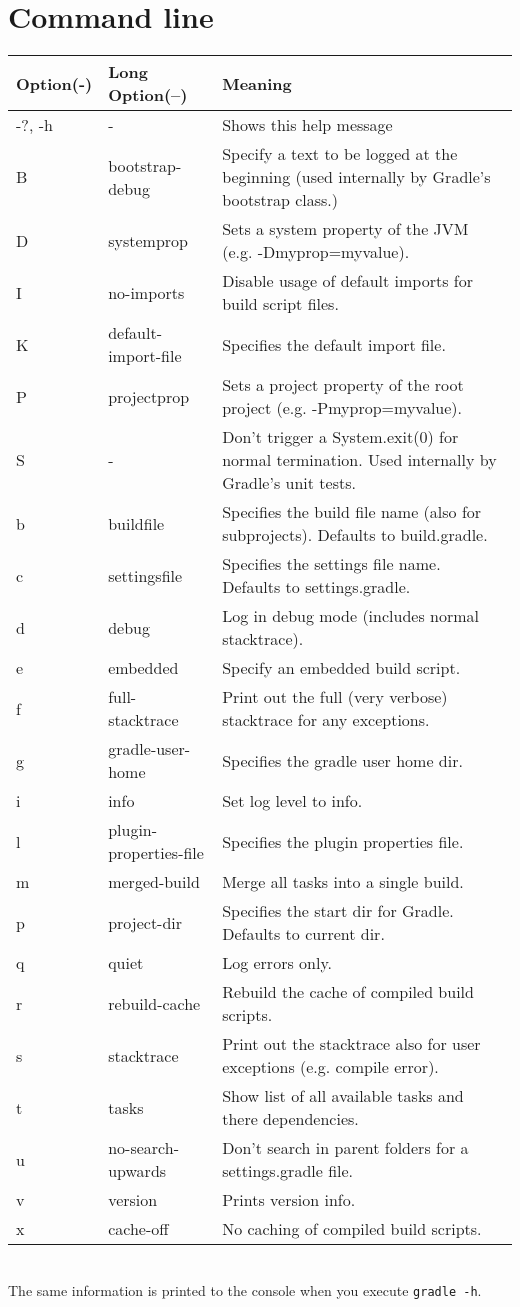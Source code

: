 \chapter{Command line} %
\label{cha:command_line}

\begin{tabular}{l|l|l}
\textbf{Option}(-) & \textbf{Long Option}(--) & \textbf{Meaning}\\ \hline
-?, -h  & -           & Shows this help message\\
B & bootstrap-debug & Specify a text to be logged at the beginning (used internally by Gradle's bootstrap class.)\\
D & systemprop       & Sets a system property of the JVM (e.g. -Dmyprop=myvalue).\\ 
I & no-imports        & Disable usage of default imports for build script files.\\
K & default-import-file & Specifies the default import file.\\ 
P & projectprop  & Sets a project property of the root project (e.g. -Pmyprop=myvalue).\\
S & - & Don't trigger a System.exit(0) for normal termination. Used internally by Gradle's unit tests.\\
b & buildfile        & Specifies the build file name (also for subprojects). Defaults to build.gradle.\\
c & settingsfile     & Specifies the settings file name. Defaults to settings.gradle.\\
d & debug            & Log in debug mode (includes normal stacktrace).\\
e & embedded         & Specify an embedded build script.\\
f & full-stacktrace  & Print out the full (very verbose) stacktrace for any exceptions.\\
g & gradle-user-home & Specifies the gradle user home dir.\\
i & info             & Set log level to info.\\
l & plugin-properties-file & Specifies the plugin properties file.\\
m & merged-build     & Merge all tasks into a single build.\\
p & project-dir      & Specifies the start dir for Gradle. Defaults to current dir.\\
q & quiet            & Log errors only.\\
r & rebuild-cache    & Rebuild the cache of compiled build scripts.\\
s & stacktrace       & Print out the stacktrace also for user exceptions (e.g. compile error).\\
t & tasks            & Show list of all available tasks and there dependencies.\\
u & no-search-upwards  & Don't search in parent folders for a settings.gradle file.\\
v & version          & Prints version info.\\
x & cache-off        & No caching of compiled build scripts.\\

\end{tabular}
\\
 
\noindent The same information is printed to the console when you execute \texttt{gradle -h}.\\
